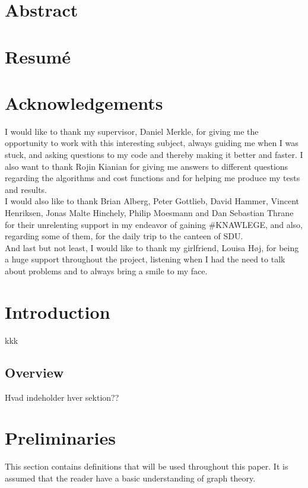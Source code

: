 \documentclass[a4paper,10pt,titlepage]{paper}
\begin{document}
\begin{titlepage}
\end{titlepage}

\vfill
\section*{Abstract}

\section*{Resumé}
\newpage

\tableofcontents
\newpage


\section{Acknowledgements}
I would like to thank my supervisor, Daniel Merkle, for giving me the opportunity to work with this interesting subject, always guiding me when I was stuck, and asking questions to my code and thereby making it better and faster. I also want to thank Rojin Kianian for giving me answers to different questions regarding the algorithms and cost functions and for helping me produce my tests and results.\\
I would also like to thank Brian Alberg, Peter Gottlieb, David Hammer, Vincent Henriksen, Jonas Malte Hinchely, Philip Moesmann and Dan Sebastian Thrane for their unrelenting support in my endeavor of gaining \#KNAWLEGE, and also, regarding some of them, for the daily trip to the canteen of SDU.\\
And last but not least, I would like to thank my girlfriend, Louisa Høj, for being a huge support throughout the project, listening when I had the need to talk about problems and to always bring a smile to my face.
\section{Introduction}
kkk \cite{Grzybowski}\\
\subsection{Overview}
Hvad indeholder hver sektion??

\section{Preliminaries}

This section contains definitions that will be used throughout this paper. It is assumed that the reader have a basic understanding of graph theory. \\
\end{document}
